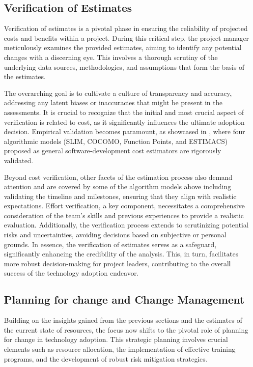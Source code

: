\documentclass{article}
\begin{document}
\subsection{Verification of Estimates}
Verification of estimates is a pivotal phase in ensuring the reliability of projected costs and benefits within a project. During this critical step, the project manager meticulously examines the provided estimates, aiming to identify any potential changes with a discerning eye. This involves a thorough scrutiny of the underlying data sources, methodologies, and assumptions that form the basis of the estimates.\newline

\noindent The overarching goal is to cultivate a culture of transparency and accuracy, addressing any latent biases or inaccuracies that might be present in the assessments. It is crucial to recognize that the initial and most crucial aspect of verification is related to cost, as it significantly influences the ultimate adoption decision. Empirical validation becomes paramount, as showcased in \cite{reference5}, where four algorithmic models (SLIM, COCOMO, Function Points, and ESTIMACS) proposed as general software-development cost estimators are rigorously validated.\newline

\noindent Beyond cost verification, other facets of the estimation process also demand attention and are covered by some of the algorithm models above including validating the timeline and milestones, ensuring that they align with realistic expectations. Effort verification, a key component, necessitates a comprehensive consideration of the team's skills and previous experiences to provide a realistic evaluation. Additionally, the verification process extends to scrutinizing potential risks and uncertainties, avoiding decisions based on subjective or personal grounds. In essence, the verification of estimates serves as a safeguard, significantly enhancing the credibility of the analysis. This, in turn, facilitates more robust decision-making for project leaders, contributing to the overall success of the technology adoption endeavor.

\subsection{Planning for change and Change Management}
Building on the insights gained from the previous sections and the estimates of the current state of resources, the focus now shifts to the pivotal role of planning for change in technology adoption. This strategic planning involves crucial elements such as resource allocation, the implementation of effective training programs, and the development of robust risk mitigation strategies. \newline
\end{document}
